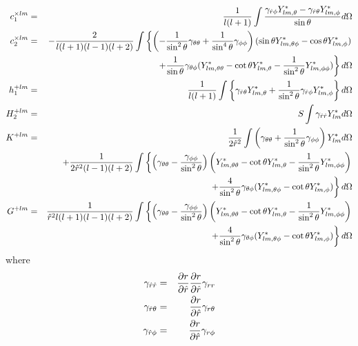\documentclass{article}
\begin{document}
\begin{eqnarray*}
c_1^{\times lm}  &=&  \frac{1}{l(l+1)}
                      \int \frac{\gamma_{\hat{r}\phi}Y^*_{lm,\theta}
                                -\gamma_{\hat{r}\theta} Y^*_{lm,\phi} }
                     {\sin\theta}d\Omega
\\
c_2^{\times lm} & = & -\frac{2}{l(l+1)(l-1)(l+2)}
                      \int\left\{
           \left(-\frac{1}{\sin^2\theta}\gamma_{\theta\theta}+\frac{1}
           {\sin^4\theta}\gamma_{\phi\phi}\right)
           (\sin\theta Y^*_{lm,\theta\phi}-\cos\theta Y^*_{lm,\phi})
\right.
\\
&&\left.
           + \frac{1}{\sin\theta} \gamma_{\theta\phi}
           (Y^*_{lm,\theta\theta}-\cot\theta Y^*_{lm,\theta}
           -\frac{1}{\sin^2\theta}Y^*_{lm,\phi\phi}) \right\}d\Omega
\\
h_1^{+lm} &=& \frac{1}{l(l+1)}
            \int \left\{
                \gamma_{\hat{r}\theta} Y^*_{lm,\theta} + \frac{1}{\sin^2\theta}
                \gamma_{\hat{r}\phi}Y^*_{lm,\phi}\right\} d\Omega
\\
H_2^{+lm} &=& S  \int \gamma_{\hat{r}\hat{r}} Y^*_{lm} d\Omega
\\
K^{+lm}   &=& \frac{1}{2\hat{r}^2} \int \left(\gamma_{\theta\theta}+
           \frac{1}{\sin^2\theta}\gamma_{\phi\phi}\right)Y^*_{lm}
           d\Omega
\\
          &&+\frac{1}{2\hat{r}^2(l-1)(l+2)}
\int \left\{
  \left(\gamma_{\theta\theta}-\frac{\gamma_{\phi\phi}}{\sin^2\theta}\right)
    \left(Y^*_{lm,\theta\theta}-\cot\theta Y^*_{lm,\theta}-\frac{1}{\sin^2\theta}
    Y^*_{lm,\phi\phi}\right) 
\right.
\\
&&\left.
   + \frac{4}{\sin^2\theta}\gamma_{\theta\phi}(Y^*_{lm,\theta\phi}-\cot\theta
     Y^*_{lm,\phi})
     \right \} d\Omega
\\
G^{+lm}  &=& \frac{1}{\hat{r}^2 l(l+1)(l-1)(l+2)}
  \int \left\{
  \left(\gamma_{\theta\theta}-\frac{\gamma_{\phi\phi}}{\sin^2\theta}\right)
    \left(Y^*_{lm,\theta\theta}-\cot\theta Y^*_{lm,\theta}-\frac{1}{\sin^2\theta}
    Y^*_{lm,\phi\phi}\right) 
\right.
\\
&&\left.
   +\frac{4}{\sin^2\theta}\gamma_{\theta\phi}(Y^*_{lm,\theta\phi}-\cot\theta
   Y^*_{lm,\phi})
   \right\}d\Omega
\end{eqnarray*}
where
\begin{eqnarray}
\gamma_{\hat{r}\hat{r}}      & = & \frac{\partial r}{\partial \hat{r}}
                       \frac{\partial r}{\partial \hat{r}}
                       \gamma_{rr} 
\\
\gamma_{\hat{r}\theta} & = & \frac{\partial r}{\partial \hat{r}}
                       \gamma_{r\theta} 
\\
\gamma_{\hat{r}\phi}   & = & \frac{\partial r}{\partial \hat{r}}
                       \gamma_{r\phi}
\end{eqnarray}
\end{document}
